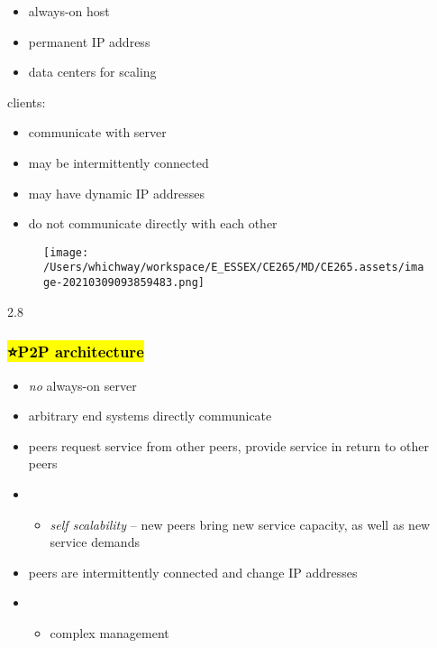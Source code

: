 \documentclass[
]{article}
\begin{document}
\begin{itemize}
\item
  always-on host
\item
  permanent IP address
\item
  data centers for scaling
\end{itemize}

clients:

\begin{itemize}
\item
  communicate with server
\item
  may be intermittently connected
\item
  may have dynamic IP addresses
\item
  do not communicate directly with each other
\end{itemize}

\begin{figure}
\centering
\texttt{[image: /Users/whichway/workspace/E\_ESSEX/CE265/MD/CE265.assets/image-20210309093859483.png]}
\caption{}
\end{figure}

2.8

\hypertarget{p2p-architecture}{%
\subsubsection{\texorpdfstring{\hl{⭐️P2P
architecture}}{⭐️P2P architecture}}\label{p2p-architecture}}

\begin{itemize}
\item
  \emph{no} always-on server
\item
  arbitrary end systems directly communicate
\item
  peers request service from other peers, provide service in return to
  other peers
\item
  \begin{itemize}
  \item
    \emph{self scalability} -- new peers bring new service capacity, as
    well as new service demands
  \end{itemize}
\item
  peers are intermittently connected and change IP addresses
\item
  \begin{itemize}
  \item
    complex management
  \end{itemize}
\end{itemize}
\end{document}
